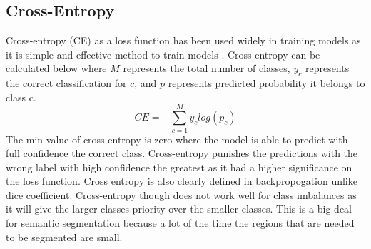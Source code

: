 \subsection{Cross-Entropy}
    Cross-entropy (CE) as a loss function has been used widely in training models as it is simple and effective method to train models \cite{deBoer2005}. 
    Cross entropy can be calculated below where $M$ represents the total number of classes, $y_c$ represents the correct classification for $c$, and $p$ represents predicted probability it belongs to class c. 
\begin{equation}
 CE = -\sum_{c=1}^{M}{y_{c}log(p_{c})}  \label{eq:crossentropy} 
\end{equation}
    The min value of cross-entropy is zero where the model is able to predict with full confidence the correct class. 
    Cross-entropy punishes the predictions with the wrong label with high confidence the greatest as it had a higher significance on the loss function. 
    Cross entropy is also clearly defined in backpropogation unlike dice coefficient. 
    Cross-entropy though does not work well for class imbalances as it will give the larger classes priority over the smaller classes.
    This is a big deal for semantic segmentation because a lot of the time the regions that are needed to be segmented are small. 
